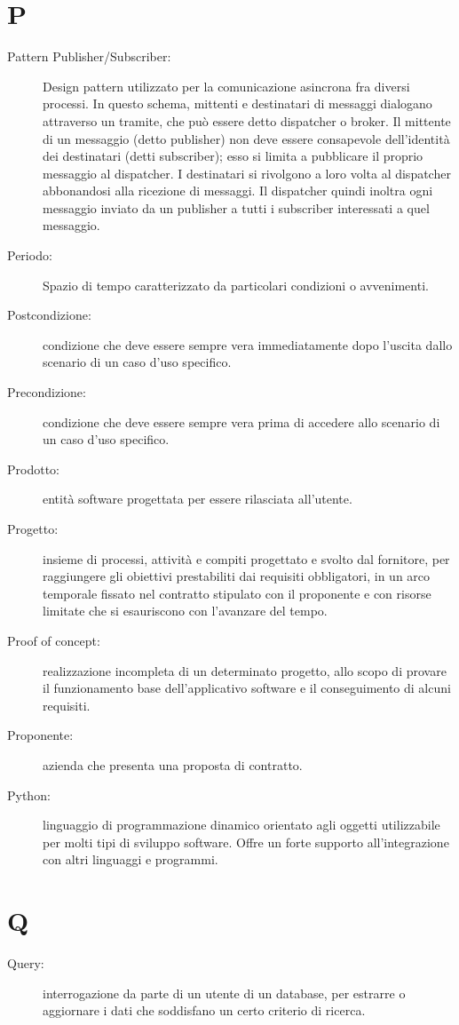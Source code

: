 \documentclass{article}
\begin{document}
	\section{P}
	\begin{description}
		\item[Pattern Publisher/Subscriber:] Design pattern utilizzato per la comunicazione asincrona fra diversi processi. In questo schema, mittenti e destinatari di messaggi dialogano attraverso un tramite, che può essere detto dispatcher o broker. Il mittente di un messaggio (detto publisher) non deve essere consapevole dell'identità dei destinatari (detti subscriber); esso si limita a pubblicare il proprio messaggio al dispatcher. I destinatari si rivolgono a loro volta al dispatcher abbonandosi alla ricezione di messaggi. Il dispatcher quindi inoltra ogni messaggio inviato da un publisher a tutti i subscriber interessati a quel messaggio.
		\item[Periodo:] Spazio di tempo caratterizzato da particolari condizioni o avvenimenti.
		\item[Postcondizione:] condizione che deve essere sempre vera immediatamente dopo l'uscita dallo scenario di un caso d'uso specifico.
		\item[Precondizione:] condizione che deve essere sempre vera prima di accedere allo scenario di un caso d'uso specifico.
		\item[Prodotto:] entità software progettata per essere rilasciata all'utente.
		\item[Progetto:] insieme di processi, attività e compiti progettato e svolto dal fornitore, per raggiungere gli obiettivi prestabiliti dai requisiti obbligatori, in un arco temporale fissato nel contratto stipulato con il proponente e con risorse limitate che si esauriscono con l'avanzare del tempo.
		\item[Proof of concept:] realizzazione incompleta di un determinato progetto, allo scopo di provare il funzionamento base dell'applicativo software e il conseguimento di alcuni requisiti.
		\item[Proponente:] azienda che presenta una proposta di contratto.
		\item[Python:] linguaggio di programmazione dinamico orientato agli oggetti utilizzabile per molti tipi di sviluppo software. Offre un forte supporto all'integrazione con altri linguaggi e programmi.
	\end{description}
	\newpage
	\section{Q}
	\begin{description}
		\item[Query:] interrogazione da parte di un utente di un database, per estrarre o aggiornare i dati che soddisfano un certo criterio di ricerca.
	\end{description}
	\newpage
\end{document}
